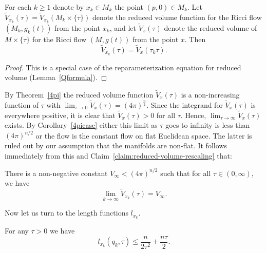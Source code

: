 \begin{claim}\label{claim:reduced-volume-rescaling}
\label{scaleinv2}
For each $k\ge 1$ denote by $x_k\in M_k$ the point $(p,0)\in
M_k$. Let $\widetilde V_{x_k}(\tau)=\widetilde
V_{x_k}(M_k\times\{\tau\})$ denote the reduced volume function for
the Ricci flow $(M_k,g_k(t))$ from the point $x_k$, and let
$\widetilde V_x(\tau)$ denote the reduced volume of
$M\times\{\tau\}$ for the Ricci flow $(M,g(t))$ from the point $x$.
Then
$$\widetilde V_{x_k}(\tau) = \widetilde V_x (\bar \tau_{k}\tau).$$
\end{claim}


\begin{proof}
This is a special case of the reparameterization equation for
reduced volume (Lemma~\ref{Qformula}).
\end{proof}

By Theorem~\ref{4pi} the reduced volume function $\widetilde
V_x(\tau)$ is a non-increasing function of $\tau$ with $\lim_{\tau\rightarrow 0}\widetilde V_x(\tau)=(4\pi)^{\frac{n}{2}}$.
Since the integrand for $\widetilde V_x(\tau)$ is everywhere
positive, it is clear that $\widetilde V_x(\tau)>0$ for all $\tau$.
Hence, $\lim_{\tau\rightarrow\infty}\widetilde V_x(\tau)$
exists. By Corollary~\ref{4picase} either this limit as $\tau$ goes
to infinity is less than $(4\pi)^{n/2}$ or the flow is the constant
flow on flat Euclidean space. The latter is ruled out by our
assumption that the manifolds are non-flat. It follows immediately
from this and Claim~\ref{claim:reduced-volume-rescaling} that:

\begin{corollary}\label{cor:reduced-volume-limit-constant}
\label{redvolconst}
There is a non-negative constant $V_\infty<(4\pi)^{n/2}$ such that
for all $\tau\in(0,\infty)$, we have
\begin{equation}\label{limVeqn}
\lim_{k\rightarrow\infty}\widetilde V_{x_k}(\tau)=V_\infty.
\end{equation}
\end{corollary}

Now let us turn to the length functions $l_{x_k}$.


\begin{claim}\label{claim:qk-length-bound}
\label{tausqtau}
For any $\tau>0$ we have
$$l_{x_k}(q_k,\tau)\le \frac{n}{2\tau^2}+\frac{n\tau}{2}.$$
\end{claim}


